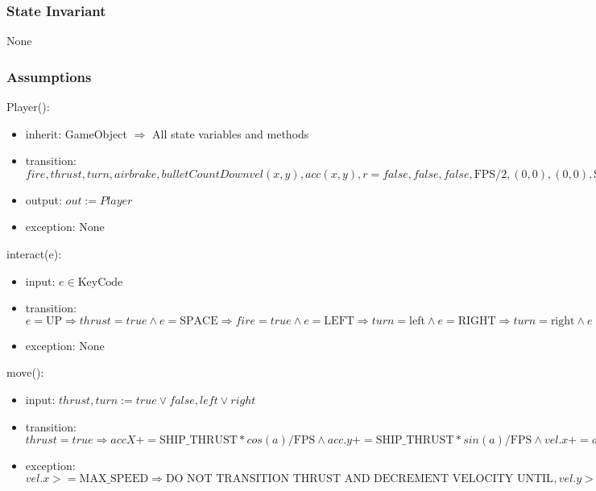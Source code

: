 \documentclass[12pt]{article}
\begin{document}
\subsubsection* {State Invariant}

None

\subsubsection* {Assumptions}

Player():
\begin{itemize}
    \item inherit: GameObject $\Rightarrow$ All state variables and methods
    \item transition: $ fire, thrust, turn, airbrake, bulletCountDown vel(x,y), acc(x,y), r = false, false, false, \mbox{FPS}/2, (0,0), (0,0), \mbox{SHIP\_SIZE/2}$
    \item output: $out := Player$
    \item exception: None
\end{itemize}

\noindent interact(e):
\begin{itemize}
  \item input: $e \in \mbox{KeyCode}$
  \item transition: $e = \mbox{UP} \Rightarrow thrust = true \land e = \mbox{SPACE} \Rightarrow fire = true \land e = \mbox{LEFT} \Rightarrow turn = \mbox{left} \land e = \mbox{RIGHT} \Rightarrow turn = \mbox{right} \land e = \mbox{DOWN} \Rightarrow airbrake = true$
  \item exception: None
\end{itemize}

\noindent move():
\begin{itemize}
  \item input: $thrust, turn := true \lor false, left \lor right$
  \item transition: $thrust = true \Rightarrow accX += \mbox{SHIP\_THRUST} * cos(a)/\mbox{FPS} \land acc.y += \mbox{SHIP\_THRUST} * sin(a)/\mbox{FPS} \land vel.x += acc.x \land vel.y+= acc.y, thrust = false \Rightarrow \mbox{DO NOTHING}, turn = right \Rightarrow rot = -\mbox{TURN\_SPEED}/180*\mbox{PI}/\mbox{FPS}, turn = left \Rightarrow rot =  \mbox{TURN\_SPEED}/180*\mbox{PI}/\mbox{FPS}, turn \lnot (right \lor left) \Rightarrow rot = 0,   space, left, right, down := thrust = true, fire = true, turn = left, turn = right, airbrake = true$
  \item exception: $vel.x >= \mbox{MAX\_SPEED} \Rightarrow \mbox{DO NOT TRANSITION THRUST AND DECREMENT VELOCITY UNTIL IT IS BELOW MAX SPEED}, vel.y >= max \Rightarrow \mbox{DO NOT TRANSITION THRUST AND DECREMENT VELOCITY UNTIL IT IS BELOW MAX SPEED}$
\end{itemize}
\end{document}
